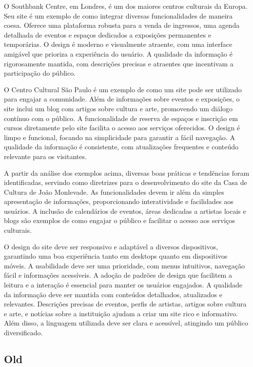 O Southbank Centre, em Londres, é um dos maiores centros culturais da Europa. Seu site é um exemplo de como integrar diversas funcionalidades de maneira coesa. Oferece uma plataforma robusta para a venda de ingressos, uma agenda detalhada de eventos e espaços dedicados a exposições permanentes e temporárias. O design é moderno e visualmente atraente, com uma interface amigável que prioriza a experiência do usuário. A qualidade da informação é rigorosamente mantida, com descrições precisas e atraentes que incentivam a participação do público.

O Centro Cultural São Paulo é um exemplo de como um site pode ser utilizado para engajar a comunidade. Além de informações sobre eventos e exposições, o site inclui um blog com artigos sobre cultura e arte, promovendo um diálogo contínuo com o público. A funcionalidade de reserva de espaços e inscrição em cursos diretamente pelo site facilita o acesso aos serviços oferecidos. O design é limpo e funcional, focando na simplicidade para garantir a fácil navegação. A qualidade da informação é consistente, com atualizações frequentes e conteúdo relevante para os visitantes.

A partir da análise dos exemplos acima, diversas boas práticas e tendências foram identificadas, servindo como diretrizes para o desenvolvimento do site da Casa de Cultura de João Monlevade. As funcionalidades devem ir além da simples apresentação de informações, proporcionando interatividade e facilidades aos usuários. A inclusão de calendários de eventos, áreas dedicadas a artistas locais e blogs são exemplos de como engajar o público e facilitar o acesso aos serviços culturais.

O design do site deve ser responsivo e adaptável a diversos dispositivos, garantindo uma boa experiência tanto em desktops quanto em dispositivos móveis. A usabilidade deve ser uma prioridade, com menus intuitivos, navegação fácil e informações acessíveis. A adoção de padrões de design que facilitem a leitura e a interação é essencial para manter os usuários engajados. A qualidade da informação deve ser mantida com conteúdos detalhados, atualizados e relevantes. Descrições precisas de eventos, perfis de artistas, artigos sobre cultura e arte, e notícias sobre a instituição ajudam a criar um site rico e informativo. Além disso, a linguagem utilizada deve ser clara e acessível, atingindo um público diversificado.

\subsection{Old}


